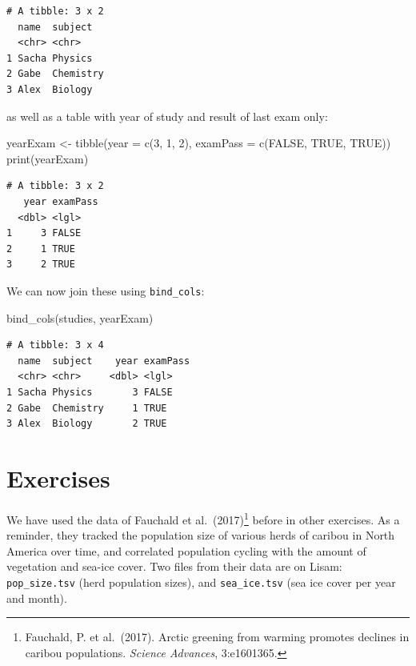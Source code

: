 \documentclass[
  letterpaper,
  DIV=11,
  numbers=noendperiod]{scrreprt}
\newenvironment{Shaded}{\begin{snugshade}}{\end{snugshade}}
\newcommand{\AttributeTok}[1]{\textcolor[rgb]{0.40,0.45,0.13}{#1}}
\newcommand{\ConstantTok}[1]{\textcolor[rgb]{0.56,0.35,0.01}{#1}}
\newcommand{\DecValTok}[1]{\textcolor[rgb]{0.68,0.00,0.00}{#1}}
\newcommand{\FunctionTok}[1]{\textcolor[rgb]{0.28,0.35,0.67}{#1}}
\newcommand{\NormalTok}[1]{\textcolor[rgb]{0.00,0.23,0.31}{#1}}
\newcommand{\OtherTok}[1]{\textcolor[rgb]{0.00,0.23,0.31}{#1}}
\begin{document}
\begin{verbatim}
# A tibble: 3 x 2
  name  subject  
  <chr> <chr>    
1 Sacha Physics  
2 Gabe  Chemistry
3 Alex  Biology  
\end{verbatim}

as well as a table with year of study and result of last exam only:

\begin{Shaded}
\begin{Highlighting}[]
\NormalTok{yearExam }\OtherTok{\textless{}{-}} \FunctionTok{tibble}\NormalTok{(}\AttributeTok{year     =} \FunctionTok{c}\NormalTok{(}\DecValTok{3}\NormalTok{, }\DecValTok{1}\NormalTok{, }\DecValTok{2}\NormalTok{),}
                   \AttributeTok{examPass =} \FunctionTok{c}\NormalTok{(}\ConstantTok{FALSE}\NormalTok{, }\ConstantTok{TRUE}\NormalTok{, }\ConstantTok{TRUE}\NormalTok{))}
\FunctionTok{print}\NormalTok{(yearExam)}
\end{Highlighting}
\end{Shaded}

\begin{verbatim}
# A tibble: 3 x 2
   year examPass
  <dbl> <lgl>   
1     3 FALSE   
2     1 TRUE    
3     2 TRUE    
\end{verbatim}

We can now join these using \texttt{bind\_cols}:

\begin{Shaded}
\begin{Highlighting}[]
\FunctionTok{bind\_cols}\NormalTok{(studies, yearExam)}
\end{Highlighting}
\end{Shaded}

\begin{verbatim}
# A tibble: 3 x 4
  name  subject    year examPass
  <chr> <chr>     <dbl> <lgl>   
1 Sacha Physics       3 FALSE   
2 Gabe  Chemistry     1 TRUE    
3 Alex  Biology       2 TRUE    
\end{verbatim}

\hypertarget{exercises}{%
\section{Exercises}\label{exercises}}

We have used the data of Fauchald et al.~(2017)\footnote{Fauchald, P. et
  al.~(2017). Arctic greening from warming promotes declines in caribou
  populations. \emph{Science Advances}, 3:e1601365.} before in other
exercises. As a reminder, they tracked the population size of various
herds of caribou in North America over time, and correlated population
cycling with the amount of vegetation and sea-ice cover. Two files from
their data are on Lisam: \texttt{pop\_size.tsv} (herd population sizes),
and \texttt{sea\_ice.tsv} (sea ice cover per year and month).
\end{document}
